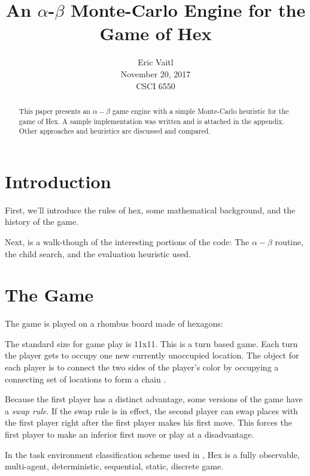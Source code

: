 \documentclass[12pt,titlepage]{amsart}
\title{An $\alpha$-$\beta$ Monte-Carlo Engine for the Game of Hex}
\author{Eric Vaitl\\November 20, 2017\\CSCI 6550}
\begin{document}
\begin{abstract}

    This paper presents an $\alpha-\beta$ game engine with a simple Monte-Carlo
    heuristic for the game of Hex. A sample implementation was written and is
    attached in the appendix. Other approaches and heuristics are discussed and
    compared.

\end{abstract}

\maketitle

\section{Introduction}

First, we'll introduce the rules of hex, some mathematical background, and the
history of the game.

Next, is a walk-though of the interesting portions of the code: The $\alpha-\beta$
routine, the child search, and the evaluation heuristic used.

\section{The Game}

The game is played on a rhombus board made of hexagons:

\begin{HexBoard}[board size=5]
\end{HexBoard}

The standard size for game play is 11x11.  This is a turn based game. Each turn
the player gets to occupy one new currently unoccupied location. The object for
each player is to connect the two sides of the player's color by occupying a
connecting set of locations to form a chain \cite{Maarup05}.

Because the first player has a distinct advantage, some versions of the game
have a \emph{swap rule}. If the swap rule is in effect, the second player can
swap places with the first player right after the first player makes his first
move. This forces the first player to make an inferior first move or play at a
disadvantage.

In the task environment classification scheme used in \cite{RN:AIAMA:2003}, Hex
is a fully observable, multi-agent, deterministic, sequential, static, discrete
game.
\end{document}
